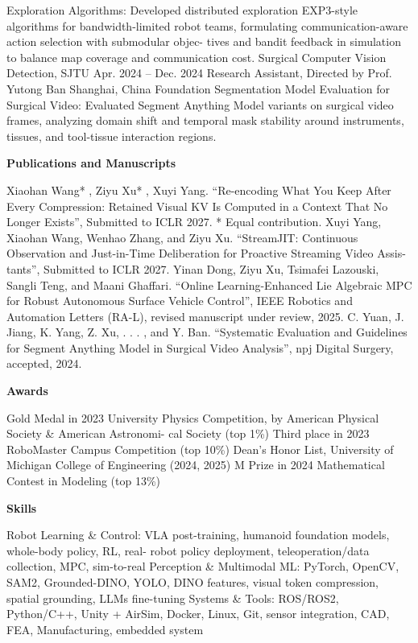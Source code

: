 \documentclass[10pt,letterpaper]{article}
\begin{document}
Exploration Algorithms: Developed distributed exploration EXP3-style algorithms for bandwidth-limited robot teams, formulating communication-aware action selection with submodular objec- tives and bandit feedback in simulation to balance map coverage and communication cost. Surgical Computer Vision Detection, SJTU Apr. 2024 -- Dec. 2024 Research Assistant, Directed by Prof. Yutong Ban Shanghai, China  Foundation Segmentation Model Evaluation for Surgical Video: Evaluated Segment Anything Model variants on surgical video frames, analyzing domain shift and temporal mask stability around instruments, tissues, and tool-tissue interaction regions. \par\medskip\textbf{Publications and Manuscripts}\par   Xiaohan Wang* , Ziyu Xu* , Xuyi Yang. ``Re-encoding What You Keep After Every Compression: Retained Visual KV Is Computed in a Context That No Longer Exists'', Submitted to ICLR 2027. * Equal contribution.  Xuyi Yang, Xiaohan Wang, Wenhao Zhang, and Ziyu Xu. ``StreamJIT: Continuous Observation and Just-in-Time Deliberation for Proactive Streaming Video Assis- tants'', Submitted to ICLR 2027.  Yinan Dong, Ziyu Xu, Tsimafei Lazouski, Sangli Teng, and Maani Ghaffari. ``Online Learning-Enhanced Lie Algebraic MPC for Robust Autonomous Surface Vehicle Control'', IEEE Robotics and Automation Letters (RA-L), revised manuscript under review, 2025.  C. Yuan, J. Jiang, K. Yang, Z. Xu, . . . , and Y. Ban. ``Systematic Evaluation and Guidelines for Segment Anything Model in Surgical Video Analysis'', npj Digital Surgery, accepted, 2024. \par\medskip\textbf{Awards}\par   Gold Medal in 2023 University Physics Competition, by American Physical Society \& American Astronomi- cal Society (top 1\%)  Third place in 2023 RoboMaster Campus Competition (top 10\%)  Dean's Honor List, University of Michigan College of Engineering (2024, 2025)  M Prize in 2024 Mathematical Contest in Modeling (top 13\%) \par\medskip\textbf{Skills}\par   Robot Learning \& Control: VLA post-training, humanoid foundation models, whole-body policy, RL, real- robot policy deployment, teleoperation/data collection, MPC, sim-to-real  Perception \& Multimodal ML: PyTorch, OpenCV, SAM2, Grounded-DINO, YOLO, DINO features, visual token compression, spatial grounding, LLMs fine-tuning  Systems \& Tools: ROS/ROS2, Python/C++, Unity + AirSim, Docker, Linux, Git, sensor integration, CAD, FEA, Manufacturing, embedded system\end{document}
\end{document}
